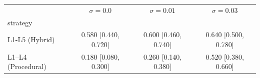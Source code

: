 \begin{tabular}{lccc}
\toprule
 & $\sigma=0.0$ & $\sigma=0.01$ & $\sigma=0.03$ \\
strategy &  &  &  \\
\midrule
L1-L5 (Hybrid) & 0.580 [0.440, 0.720] & 0.600 [0.460, 0.740] & 0.640 [0.500, 0.780] \\
L1–L4 (Procedural) & 0.180 [0.080, 0.300] & 0.260 [0.140, 0.380] & 0.520 [0.380, 0.660] \\
\bottomrule
\end{tabular}
